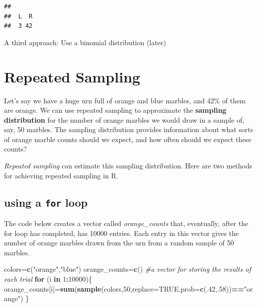\documentclass[
]{book}
\newenvironment{Shaded}{\begin{snugshade}}{\end{snugshade}}
\newcommand{\AttributeTok}[1]{\textcolor[rgb]{0.13,0.29,0.53}{#1}}
\newcommand{\CommentTok}[1]{\textcolor[rgb]{0.56,0.35,0.01}{\textit{#1}}}
\newcommand{\ConstantTok}[1]{\textcolor[rgb]{0.56,0.35,0.01}{#1}}
\newcommand{\ControlFlowTok}[1]{\textcolor[rgb]{0.13,0.29,0.53}{\textbf{#1}}}
\newcommand{\DecValTok}[1]{\textcolor[rgb]{0.00,0.00,0.81}{#1}}
\newcommand{\FunctionTok}[1]{\textcolor[rgb]{0.13,0.29,0.53}{\textbf{#1}}}
\newcommand{\NormalTok}[1]{#1}
\newcommand{\OtherTok}[1]{\textcolor[rgb]{0.56,0.35,0.01}{#1}}
\newcommand{\SpecialCharTok}[1]{\textcolor[rgb]{0.81,0.36,0.00}{\textbf{#1}}}
\newcommand{\StringTok}[1]{\textcolor[rgb]{0.31,0.60,0.02}{#1}}
\theoremstyle{definition}
\theoremstyle{definition}
\theoremstyle{definition}
\theoremstyle{definition}
\theoremstyle{remark}
\begin{document}
\begin{verbatim}
## 
##  L  R 
##  3 42
\end{verbatim}

A third approach: Use a binomial distribution (later)

\section{Repeated Sampling}\label{repeated-sampling}

Let's say we have a huge urn full of orange and blue marbles, and 42\% of them are orange. We can use repeated sampling to approximate the \textbf{sampling distribution} for the number of orange marbles we would draw in a sample of, say, 50 marbles.
The sampling distribution provides information about what sorts of orange marble counts should we expect, and how often should we expect these counts?

\emph{Repeated sampling} can estimate this sampling distribution. Here are two methods for achieving repeated sampling in R.

\subsection*{\texorpdfstring{using a \texttt{for} loop}{using a for loop}}\label{using-a-for-loop}

The code below creates a vector called \emph{orange\_counts} that, eventually, after the for loop has completed, has 10000 entries. Each entry in this vector gives the number of orange marbles drawn from the urn from a random sample of 50 marbles.

\begin{Shaded}
\begin{Highlighting}[]
\NormalTok{colors}\OtherTok{=}\FunctionTok{c}\NormalTok{(}\StringTok{"orange"}\NormalTok{,}\StringTok{"blue"}\NormalTok{)}
\NormalTok{orange\_counts}\OtherTok{=}\FunctionTok{c}\NormalTok{() }\CommentTok{\#a vector for storing the results of each trial}
\ControlFlowTok{for}\NormalTok{ (i }\ControlFlowTok{in} \DecValTok{1}\SpecialCharTok{:}\DecValTok{10000}\NormalTok{)\{}
\NormalTok{  orange\_counts[i]}\OtherTok{=}\FunctionTok{sum}\NormalTok{(}\FunctionTok{sample}\NormalTok{(colors,}\DecValTok{50}\NormalTok{,}\AttributeTok{replace=}\ConstantTok{TRUE}\NormalTok{,}\AttributeTok{prob=}\FunctionTok{c}\NormalTok{(.}\DecValTok{42}\NormalTok{,.}\DecValTok{58}\NormalTok{))}\SpecialCharTok{==}\StringTok{"orange"}\NormalTok{)}
\NormalTok{\}}
\end{Highlighting}
\end{Shaded}
\end{document}
